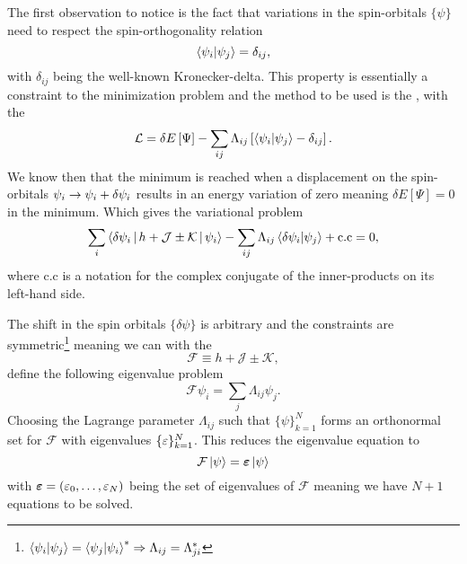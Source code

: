         The first observation to notice is the fact that variations in the
        spin-orbitals $\{\psi\}$ need to respect the spin-orthogonality
        relation
            \begin{equation}
                \braket{\psi_i}{\psi_j} = \delta_{ij},
            \end{equation}
        with $\delta_{ij}$ being the well-known Kronecker-delta. This property
        is essentially a constraint to the minimization problem and the method
        to be used is the \cite{linalgDavid},
        with the 
            \begin{equation}
                \mathcal{L} = \delta E\left[\Psi\right] -
                \sum_{ij}\Lambda_{ij}\left[\braket{\psi_i}{\psi_j} -
                \delta_{ij}\right].
            \end{equation}
        We know then that the minimum is reached when a displacement on the
        spin-orbitals $\psi_i\rightarrow\psi_i+\delta \psi_i$ results in an energy
        variation of zero meaning $\delta E\left[\Psi\right]=0$ in the minimum.
        Which gives the variational problem 
            \begin{equation}
                \sum_i \Braket{\delta\psi_i | h + \mathcal{J} \pm \mathcal{K} |
                \psi_i} - \sum_{ij} \Lambda_{ij}\braket{\delta\psi_i}{\psi_j} +
                \text{c.c} = 0,
            \end{equation}
        where $\text{c.c}$ is a notation for the complex conjugate of the
        inner-products on its left-hand side.

        The shift in the spin orbitals $\{\delta \psi\}$ is arbitrary and the
        constraints are
        symmetric\footnote{$\braket{\psi_i}{\psi_j}=\braket{\psi_j}{\psi_i}^{*}
        \Rightarrow \Lambda_{ij}=\Lambda^{*}_{ji}$} meaning we can with the
            \begin{equation}
                \mathcal{F} \equiv h + \mathcal{J} \pm \mathcal{K},
            \end{equation}
        define the following eigenvalue problem
            \begin{equation}
                \mathcal{F}\psi_i = \sum_j\Lambda_{ij}\psi_j.
            \end{equation}
        Choosing the Lagrange parameter $\Lambda_{ij}$ such that
        $\{\psi\}^N_{k=1}$ forms an orthonormal set for $\mathcal{F}$ with
        eigenvalues $\{\varepsilon\}^N_{k=1}$. This reduces the eigenvalue equation
        to
            \begin{equation}
                \mathcal{F}\ket{\psi} = \boldsymbol{{\varepsilon}}\ket{\psi}
                \label{eq:HFequations}
            \end{equation}
        with $\boldsymbol{{\varepsilon}}=(\varepsilon_0,\dots,\varepsilon_N)$ being the set of
        eigenvalues of $\mathcal{F}$ meaning we have $N+1$ equations to be
        solved.

